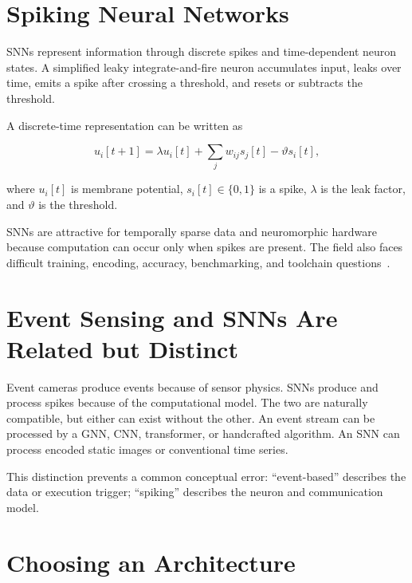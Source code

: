 \section{Spiking Neural Networks}

SNNs represent information through discrete spikes and time-dependent neuron states. A simplified leaky integrate-and-fire neuron accumulates input, leaks over time, emits a spike after crossing a threshold, and resets or subtracts the threshold.

A discrete-time representation can be written as

\[
    u_i[t+1]
    = \lambda u_i[t]
    + \sum_j w_{ij}s_j[t]
    - \vartheta s_i[t],
\]

where \(u_i[t]\) is membrane potential, \(s_i[t]\in\{0,1\}\) is a spike, \(\lambda\) is the leak factor, and \(\vartheta\) is the threshold.

SNNs are attractive for temporally sparse data and neuromorphic hardware because computation can occur only when spikes are present. The field also faces difficult training, encoding, accuracy, benchmarking, and toolchain questions~\cite{maass1997networks,tavanaei2019deep,roy2019towards,schuman2022opportunities,zhang2025snnedge}.

\section{Event Sensing and SNNs Are Related but Distinct}

Event cameras produce events because of sensor physics. SNNs produce and process spikes because of the computational model. The two are naturally compatible, but either can exist without the other. An event stream can be processed by a GNN, CNN, transformer, or handcrafted algorithm. An SNN can process encoded static images or conventional time series.

This distinction prevents a common conceptual error: ``event-based'' describes the data or execution trigger; ``spiking'' describes the neuron and communication model.

\section{Choosing an Architecture}

